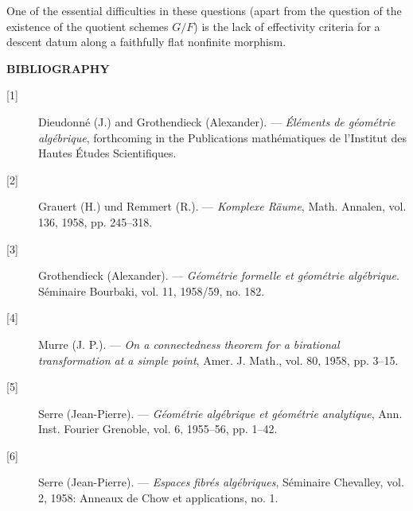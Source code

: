  One of the essential difficulties in these questions (apart
from the question of the existence of the quotient schemes $G/F$) is the lack
of effectivity criteria for a descent datum along a faithfully flat nonfinite
morphism.

\begin{center}
  \textbf{BIBLIOGRAPHY}
\end{center}

\begingroup
\small
\begin{description}
  \item[{[1]}] Dieudonné (J.) and Grothendieck (Alexander). --- \emph{Éléments
    de géométrie algébrique}, forthcoming in the Publications mathématiques de
    l'Institut des Hautes Études Scientifiques.
  \item[{[2]}] Grauert (H.) und Remmert (R.). --- \emph{Komplexe Räume}, Math.
    Annalen, vol. 136, 1958, pp. 245--318.
  \item[{[3]}] Grothendieck (Alexander). --- \emph{Géométrie formelle et
    géométrie algébrique}. Séminaire Bourbaki, vol. 11, 1958/59, no. 182.
  \item[{[4]}] Murre (J. P.). --- \emph{On a connectedness theorem for a
    birational transformation at a simple point}, Amer. J. Math., vol. 80,
    1958, pp. 3--15.
  \item[{[5]}] Serre (Jean-Pierre). --- \emph{Géométrie algébrique et géométrie
    analytique}, Ann. Inst. Fourier Grenoble, vol. 6, 1955--56, pp. 1--42.
  \item[{[6]}] Serre (Jean-Pierre). --- \emph{Espaces fibrés algébriques},
    Séminaire Chevalley, vol. 2, 1958: Anneaux de Chow et applications, no. 1.
\end{description}
\endgroup
